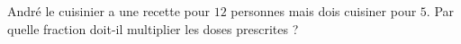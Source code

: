 
\begin{exercice}\label{exosmath-0881}

    André le cuisinier a une recette pour \( 12\) personnes mais dois cuisiner pour \( 5\). Par quelle fraction doit-il multiplier les doses prescrites ?

\end{exercice}
